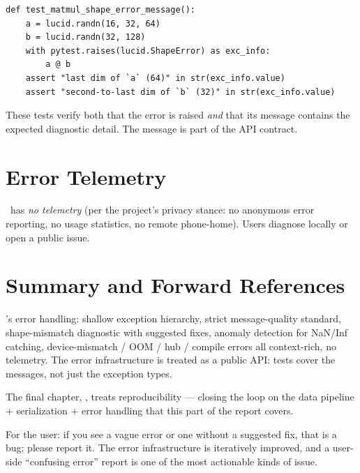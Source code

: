 \begin{lstlisting}[style=lucid,language=LucidPython]
def test_matmul_shape_error_message():
    a = lucid.randn(16, 32, 64)
    b = lucid.randn(32, 128)
    with pytest.raises(lucid.ShapeError) as exc_info:
        a @ b
    assert "last dim of `a` (64)" in str(exc_info.value)
    assert "second-to-last dim of `b` (32)" in str(exc_info.value)
\end{lstlisting}

These tests verify both that the error is raised \emph{and}
that its message contains the expected diagnostic detail. The
message is part of the API contract.

\section{Error Telemetry}
\label{sec:error_handling:error_telemetry}

\Lucid\ has \emph{no telemetry} (per the project's
privacy stance: no anonymous error reporting, no usage
statistics, no remote phone-home). Users diagnose locally
or open a public issue.

\section{Summary and Forward References}
\label{sec:error_handling:summary}

\Lucid's error handling: shallow exception hierarchy, strict
message-quality standard, shape-mismatch diagnostic with
suggested fixes, anomaly detection for NaN/Inf catching,
device-mismatch / OOM / hub / compile errors all
context-rich, no telemetry. The error infrastructure is
treated as a public API: tests cover the messages, not just
the exception types.

The final chapter, , treats
reproducibility --- closing the loop on the data pipeline +
serialization + error handling that this part of the report
covers.

\begin{lucidnote}
For the user: if you see a vague error or one without a
suggested fix, that is a bug; please report it. The error
infrastructure is iteratively improved, and a user-side
``confusing error'' report is one of the most actionable kinds
of issue.
\end{lucidnote}
